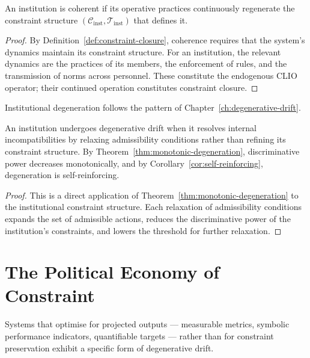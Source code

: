 \documentclass[11pt,openany]{book}
\begin{document}
\begin{proposition}
\label{prop:institutional}
An institution is coherent if its operative practices
continuously regenerate the constraint structure
$(\mathcal{C}_{\mathrm{inst}}, \mathcal{T}_{\mathrm{inst}})$
that defines it.
\end{proposition}

\begin{proof}
By Definition~\ref{def:constraint-closure}, coherence
requires that the system's dynamics maintain its constraint
structure.  For an institution, the relevant dynamics are
the practices of its members, the enforcement of rules, and
the transmission of norms across personnel.  These
constitute the endogenous CLIO operator; their continued
operation constitutes constraint closure.
\end{proof}

Institutional degeneration follows the pattern of
Chapter~\ref{ch:degenerative-drift}.

\begin{proposition}
\label{prop:institutional-degeneration}
An institution undergoes degenerative drift when it resolves
internal incompatibilities by relaxing admissibility
conditions rather than refining its constraint structure.
By Theorem~\ref{thm:monotonic-degeneration}, discriminative
power decreases monotonically, and by
Corollary~\ref{cor:self-reinforcing}, degeneration is
self-reinforcing.
\end{proposition}

\begin{proof}
This is a direct application of
Theorem~\ref{thm:monotonic-degeneration} to the
institutional constraint structure.  Each relaxation of
admissibility conditions expands the set of admissible
actions, reduces the discriminative power of the
institution's constraints, and lowers the threshold for
further relaxation.
\end{proof}

\section{The Political Economy of Constraint}
\label{sec:political-economy}

Systems that optimise for projected outputs — measurable
metrics, symbolic performance indicators, quantifiable
targets — rather than for constraint preservation exhibit
a specific form of degenerative drift.
\end{document}
